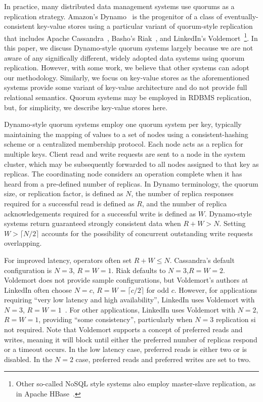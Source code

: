 \documentclass{vldb}
\begin{document}
In practice, many distributed data management systems use quorums as a
replication strategy. Amazon's Dynamo~\cite{dynamo} is the progenitor
of a class of eventually-consistent key-value stores using a
particular variant of quorum-style replication that includes Apache
Cassandra~\cite{cassandra, cassandra-sigmod}, Basho's
Riak~\cite{riak}, and LinkedIn's Voldemort~\cite{voldemort,
  voldemortpub}\footnote{Other so-called NoSQL style systems also
  employ master-slave replication, as in Apache HBase~\cite{hbase}.}.
In this paper, we discuss Dynamo-style quorum systems largely because
we are not aware of any significally different, widely adopted data
systems using quorum replication.  However, with some work, we believe
that other systems can adopt our methodology.  Similarly, we focus on
key-value stores as the aforementioned systems provide some variant of
key-value architecture and do not provide full relational semantics.
Quorum systems may be employed in RDBMS replication, but, for
simplicity, we describe key-value stores here.

Dynamo-style quorum systems employ one quorum system per key,
typically maintaining the mapping of values to a set of nodes using a
consistent-hashing scheme or a centralized membership protocol. Each
node acts as a replica for multiple keys.  Client read and write
requests are sent to a node in the system cluster, which may be
subsequently forwarded to all nodes assigned to that key as replicas.
The coordinating node considers an operation complete when it has
heard from a pre-defined number of replicas.  In Dynamo terminology,
the quorum size, or replication factor, is defined as $N$, the number
of replica responses required for a successful read is defined as $R$,
and the number of replica acknowledgements required for a successful
write is defined as $W$. Dynamo-style systems return guaranteed
strongly consistent data when $R+W > N$.  Setting $W>\lceil N/2 \rceil$ accounts for
the possibility of concurrent outstanding write requests overlapping.

For improved latency, operators often set $R+W \leq N$.  Cassandra's
default configuration is $N$$=$$3$, $R$$=$$W$$=$$1$.  Riak defaults to
$N$$=$$3$,$R$$=$$W$$=$$2$.  Voldemort does not provide sample
configurations, but Voldemort's authors at LinkedIn often choose
$N$$=$$c$, $R$$=$$W$$=$$ \lceil c/2 \rceil$ for odd $c$.  However, for
applications requiring ``very low latency and high availability'',
LinkedIn uses Voldemort with $N$$=$$3$,
$R$$=$$W$$=$$1$~\cite{feinbergpc}.  For other applications, LinkedIn
uses Voldemort with $N$$=$$2$, $R$$=$$W$$=$$1$, providing ``some
consistency'', particularly when $N$$=$$3$ replication si not
required.  Note that Voldemort supports a concept of preferred reads
and writes, meaning it will block until either the preferred number of
replicas respond or a timeout occurs.  In the low latency case,
preferred reads is either two or is disabled.  In the $N$$=$$2$ case,
preferred reads and preferred writes are set to two.
\end{document}
